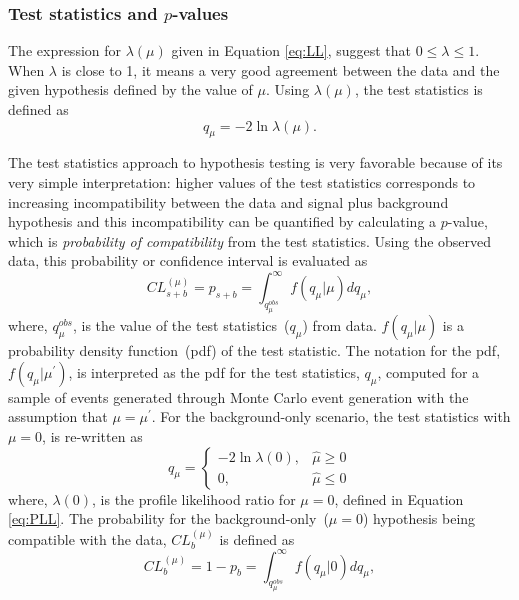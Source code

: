 \subsubsection{Test statistics and $p$-values} 
The expression for $\lambda(\mu)$ given in Equation \ref{eq:LL}, suggest that $0 \leq \lambda \leq 1$. When $\lambda$ is close to 1, it means a very good agreement between the data and the given hypothesis defined by the value of $\mu$.  Using $\lambda(\mu)$, the test statistics is defined as
\begin{equation}
 q_{\mu} = -2\ln \lambda(\mu) .
\end{equation}
\par 
The test statistics approach to hypothesis testing is very favorable because of its very simple interpretation: higher values of the test statistics corresponds to increasing incompatibility between the data and signal plus background hypothesis and this incompatibility can be quantified by calculating a $p$-value, which is \textit{probability of compatibility} from the test statistics. 
\newline
Using the observed data, this probability or confidence interval is evaluated as 
\begin{equation}
 CL^{(\mu)}_{s+b} = p_{s+b} = \int^{\infty}_{q^{obs}_{\mu}} f(q_{\mu}|\mu) dq_{\mu},
\end{equation}
where, $q^{obs}_{\mu}$, is the value of the test statistics~($q_{\mu}$) from data.
$f(q_{\mu}|\mu)$ is a probability density function~(pdf) of the test statistic. The notation for the pdf, $f(q_{\mu}|\mu^{\prime})$, is interpreted as the pdf for the test statistics, $q_{\mu}$, computed for a sample of events generated through Monte Carlo event generation with the assumption that $\mu = \mu^{\prime}$. 
\newline
For the background-only scenario, the test statistics with $\mu = 0$, is re-written as
\[\label{eq:HNULL}
 q_{\mu} = \left\lbrace  
  \begin{array}{ll}
 -2\ln \lambda(0), & \hat{\mu} \geq 0 \\
   0,              & \hat{\mu} \leq 0
  \end{array}
  \right.
\]
where, $\lambda(0)$, is the profile likelihood ratio for $\mu = 0$, defined in Equation \ref{eq:PLL}.
The probability for the background-only~($\mu = 0$) hypothesis being compatible with the data, $ CL^{(\mu)}_{b}$  is defined as
\begin{equation}\label{eq:HALT}
 CL^{(\mu)}_{b} = 1 - p_{b} = \int^{\infty}_{q^{obs}_{\mu}} f(q_{\mu}|0) dq_{\mu},
\end{equation}
